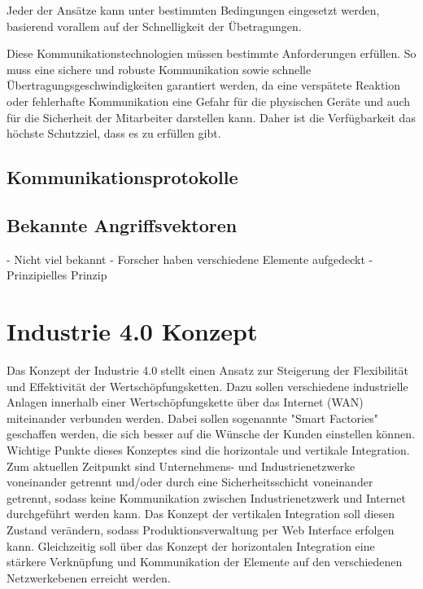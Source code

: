 Jeder der Ansätze kann unter bestimmten Bedingungen eingesetzt werden, basierend vorallem auf der Schnelligkeit der Übetragungen.

Diese Kommunikationstechnologien müssen bestimmte Anforderungen erfüllen. So muss eine sichere und robuste Kommunikation sowie schnelle Übertragungsgeschwindigkeiten garantiert werden, da eine verspätete Reaktion oder fehlerhafte Kommunikation eine Gefahr für die physischen Geräte und auch für die Sicherheit der Mitarbeiter darstellen kann. Daher ist die Verfügbarkeit das höchste Schutzziel, dass es zu erfüllen gibt.

\subsection{Kommunikationsprotokolle	}

\subsection{Bekannte Angriffsvektoren}
- Nicht viel bekannt
- Forscher haben verschiedene Elemente aufgedeckt
- Prinzipielles Prinzip

\section{Industrie 4.0 Konzept}
Das Konzept der Industrie 4.0 stellt einen Ansatz zur Steigerung der Flexibilität und Effektivität der Wertschöpfungsketten. Dazu sollen verschiedene industrielle Anlagen innerhalb einer Wertschöpfungskette über das Internet (WAN) miteinander verbunden werden. Dabei sollen sogenannte "Smart Factories" geschaffen werden, die sich besser auf die Wünsche der Kunden einstellen können. Wichtige Punkte dieses Konzeptes sind die horizontale und vertikale Integration. Zum aktuellen Zeitpunkt sind Unternehmens- und Industrienetzwerke voneinander getrennt und/oder durch eine Sicherheitsschicht voneinander getrennt, sodass keine Kommunikation zwischen Industrienetzwerk und Internet durchgeführt werden kann. Das Konzept der vertikalen Integration soll diesen Zustand verändern, sodass Produktionsverwaltung per Web Interface erfolgen kann. Gleichzeitig soll über das Konzept der horizontalen Integration eine stärkere Verknüpfung und Kommunikation der Elemente auf den verschiedenen Netzwerkebenen erreicht werden.


